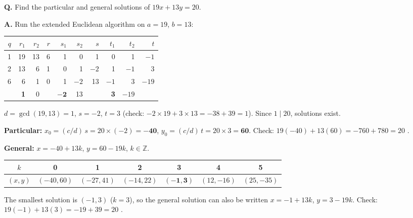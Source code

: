 \begin{worked}[: 2025--26 Q5 (3 marks), solve $19x + 13y = 20$]
\textbf{Q.} Find the particular and general solutions of $19x + 13y = 20$.

\textbf{A.} Run the extended Euclidean algorithm on $a = 19$, $b = 13$:
\begin{center}\small
\begin{tabular}{@{}r|rrr|rrr|rrr@{}}
\toprule
$q$ & $r_1$ & $r_2$ & $r$ & $s_1$ & $s_2$ & $s$ & $t_1$ & $t_2$ & $t$\\
\midrule
1 & 19 & 13 & 6 & 1 & 0 & 1 & 0 & 1 & $-1$\\
2 & 13 & 6 & 1 & 0 & 1 & $-2$ & 1 & $-1$ & 3\\
6 & 6 & 1 & 0 & 1 & $-2$ & 13 & $-1$ & 3 & $-19$\\
 & \textbf{1} & 0 & & $\mathbf{-2}$ & 13 & & \textbf{3} & $-19$ & \\
\bottomrule
\end{tabular}
\end{center}
$d = \gcd(19, 13) = 1$, $s = -2$, $t = 3$ (check: $-2 \times 19 + 3 \times 13 = -38 + 39 = 1$). Since $1 \mid 20$, solutions exist.

\textbf{Particular:} $x_0 = (c/d)\,s = 20 \times (-2) = \mathbf{-40}$, \;$y_0 = (c/d)\,t = 20 \times 3 = \mathbf{60}$. \;Check: $19(-40) + 13(60) = -760 + 780 = 20$ \checkmark.

\textbf{General:} $x = -40 + 13k$, \;$y = 60 - 19k$, \;$k \in \mathbb{Z}$.
\begin{center}\small
\begin{tabular}{@{}c|cccccc@{}}
\toprule
$k$ & 0 & 1 & 2 & 3 & 4 & 5\\
\midrule
$(x, y)$ & $(-40, 60)$ & $(-27, 41)$ & $(-14, 22)$ & $\mathbf{(-1, 3)}$ & $(12, -16)$ & $(25, -35)$\\
\bottomrule
\end{tabular}
\end{center}
The smallest solution is $(-1, 3)$ ($k = 3$), so the general solution can also be written $x = -1 + 13k$, $y = 3 - 19k$. Check: $19(-1) + 13(3) = -19 + 39 = 20$ \checkmark.
\end{worked}

